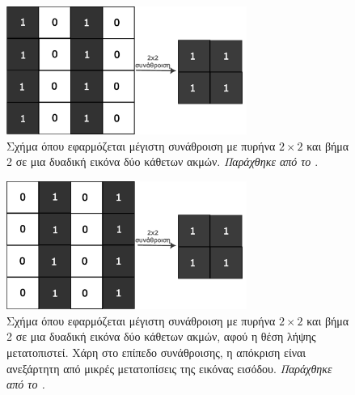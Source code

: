 \begin{figure}[h]
  \centering
  \includegraphics[width=0.7\textwidth]{images/chapter theoritical background/pool_invariance_1_gr.pdf}
  \caption{Σχήμα όπου εφαρμόζεται μέγιστη συνάθροιση με πυρήνα $2\times2$ και βήμα 2 σε μια δυαδική εικόνα δύο κάθετων ακμών. \textit{Παράχθηκε από το \href{https://inkscape.org/}{}}.}
  \label{fig:poolinvar1}
\end{figure}

\begin{figure}[h]
  \centering
  \includegraphics[width=0.7\textwidth]{images/chapter theoritical background/pool_invariance_2_gr.pdf}
  \caption{Σχήμα όπου εφαρμόζεται μέγιστη συνάθροιση με πυρήνα $2\times2$ και βήμα 2 σε μια δυαδική εικόνα δύο κάθετων ακμών, αφού η θέση λήψης μετατοπιστεί. Χάρη στο επίπεδο συνάθροισης, η απόκριση είναι ανεξάρτητη από μικρές μετατοπίσεις της εικόνας εισόδου. \textit{Παράχθηκε από το \href{https://inkscape.org/}{}.}} 
  \label{fig:poolinvar2}
\end{figure} 

